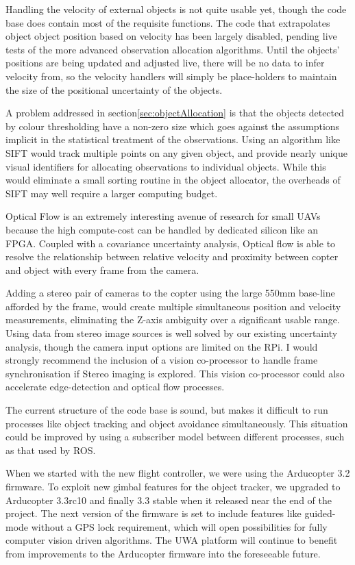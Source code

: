 \documentclass[a4paper, 11pt, titlepage]{article}
\begin{document}
  Handling the velocity of external objects is not quite usable yet, though the code base does contain most of the requisite functions.  The code that extrapolates object object position based on velocity has been largely disabled, pending live tests of the more advanced observation allocation algorithms.  Until the objects' positions are being updated and adjusted live, there will be no data to infer velocity from, so the velocity handlers will simply be place-holders to maintain the size of the positional uncertainty of the objects.

  A problem addressed in section\ref{sec:objectAllocation} is that the objects detected by colour thresholding have a non-zero size which goes against the assumptions implicit in the statistical treatment of the observations.  Using an algorithm like SIFT would track multiple points on any given object, and provide nearly unique visual identifiers for allocating observations to individual objects.  While this would eliminate a small sorting routine in the object allocator, the overheads of SIFT may well require a larger computing budget.

  Optical Flow is an extremely interesting avenue of research for small UAVs because the high compute-cost can be handled by dedicated silicon like an FPGA.  Coupled with a covariance uncertainty analysis, Optical flow is able to resolve the relationship between relative velocity and proximity between copter and object with every frame from the camera.  

  Adding a stereo pair of cameras to the copter using the large 550mm base-line afforded by the frame, would create multiple simultaneous position and velocity measurements, eliminating the Z-axis ambiguity over a significant usable range.  
  Using data from stereo image sources is well solved by our existing uncertainty analysis, though the camera input options are limited on the RPi. I would strongly recommend the inclusion of a vision co-processor to handle frame synchronisation if Stereo imaging is explored.  This vision co-processor could also accelerate edge-detection and optical flow processes.

  The current structure of the code base is sound, but makes it difficult to run processes like object tracking and object avoidance simultaneously.  This situation could be improved by using a subscriber model between different processes, such as that used by ROS.

  When we started with the new flight controller, we were using the Arducopter 3.2 firmware. To exploit new gimbal features for the object tracker, we upgraded to Arducopter 3.3rc10 and finally 3.3 stable when it released near the end of the project.  The next version of the firmware is set to include features like guided-mode without a GPS lock requirement, which will open possibilities for fully computer vision driven algorithms.  The UWA platform will continue to benefit from improvements to the Arducopter firmware into the foreseeable future.
\end{document}

